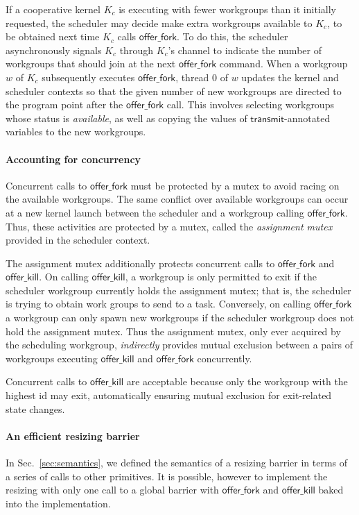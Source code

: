 \documentclass[numbers,nocopyrightspace,10pt]{sigplanconf}
\newcommand{\mysec}{Sec.~}
\newcommand{\transmit}{\mathsf{transmit}}
\newcommand{\offerfork}{\mathsf{offer\_fork}}
\newcommand{\offerkill}{\mathsf{offer\_kill}}
\begin{document}
If a cooperative kernel $K_c$ is executing with fewer workgroups than it initially requested, the scheduler may decide make extra workgroups available
to $K_c$, to be obtained next time $K_c$ calls $\offerfork$.  To do this, the scheduler asynchronously signals $K_c$ through $K_c$'s
channel to indicate the number of
workgroups that should join at the next $\offerfork$ command.
When a workgroup $w$ of $K_c$ subsequently executes $\offerfork$, thread 0 of $w$ updates the kernel and scheduler contexts so that the given number of new workgroups are directed to the program point after the $\offerfork$ call.  This involves selecting workgroups whose status is \emph{available}, as well as copying the values of $\transmit$-annotated variables to the new workgroups.

\paragraph{Accounting for concurrency}

Concurrent calls to $\offerfork$ must be protected by a mutex to avoid
racing on the available workgroups. The same conflict over available
workgroups can occur at a new kernel launch between the scheduler and
a workgroup calling $\offerfork$. Thus, these activities are protected
by a mutex, called the \emph{assignment mutex} provided in the scheduler
context.

The assignment mutex additionally protects concurrent calls to
$\offerfork$ and $\offerkill$.  On calling $\offerkill$, a workgroup
is only permitted to exit if the scheduler workgroup currently holds
the assignment mutex; that is, the scheduler is trying to obtain work
groups to send to a task.  Conversely, on calling $\offerfork$ a
workgroup can only spawn new workgroups if the scheduler workgroup
does not hold the assignment mutex.  Thus the assignment mutex, only
ever acquired by the scheduling workgroup, \emph{indirectly} provides
mutual exclusion between a pairs of workgroups executing $\offerkill$
and $\offerfork$ concurrently.

Concurrent calls to $\offerkill$ are acceptable because only the
workgroup with the highest id may exit, automatically ensuring mutual
exclusion for exit-related state changes.

\paragraph{An efficient resizing barrier}

In \mysec\ref{sec:semantics}, we defined the semantics of a resizing barrier in terms
of a series of calls to other primitives.  It is possible, however to implement the resizing with
only one call to a global barrier with $\offerfork$ and $\offerkill$
baked into the implementation. 
\end{document}
